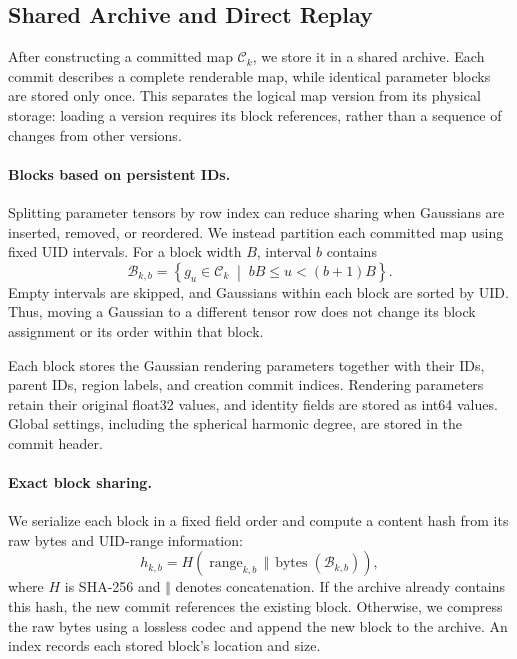 \subsection{Shared Archive and Direct Replay}
\label{sec:archive_replay}

After constructing a committed map $\mathcal{C}_k$, we store it
in a shared archive.
Each commit describes a complete renderable map, while identical
parameter blocks are stored only once.
This separates the logical map version from its physical storage:
loading a version requires its block references, rather than
a sequence of changes from other versions.

\paragraph{Blocks based on persistent IDs.}
Splitting parameter tensors by row index can reduce sharing when
Gaussians are inserted, removed, or reordered.
We instead partition each committed map using fixed UID intervals.
For a block width $B$, interval $b$ contains
\begin{equation}
    \mathcal{B}_{k,b}
    =
    \left\{
        g_u \in \mathcal{C}_k
        \;\middle|\;
        bB \leq u < (b+1)B
    \right\}.
\end{equation}
Empty intervals are skipped, and Gaussians within each block
are sorted by UID.
Thus, moving a Gaussian to a different tensor row does not change
its block assignment or its order within that block.

Each block stores the Gaussian rendering parameters together with
their IDs, parent IDs, region labels, and creation commit indices.
Rendering parameters retain their original float32 values,
and identity fields are stored as int64 values.
Global settings, including the spherical harmonic degree,
are stored in the commit header.

\paragraph{Exact block sharing.}
We serialize each block in a fixed field order and compute
a content hash from its raw bytes and UID-range information:
\begin{equation}
    h_{k,b}
    =
    H\!\left(
        \operatorname{range}_{k,b}
        \,\Vert\,
        \operatorname{bytes}(\mathcal{B}_{k,b})
    \right),
\end{equation}
where $H$ is SHA-256 and $\Vert$ denotes concatenation.
If the archive already contains this hash, the new commit references
the existing block.
Otherwise, we compress the raw bytes using a lossless codec
and append the new block to the archive.
An index records each stored block's location and size.

